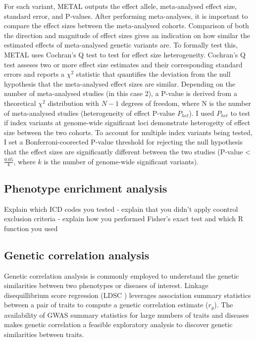 For each variant, METAL outputs the effect allele, meta-analysed effect size, standard error, and P-values. After performing meta-analyses, it is important to compare the effect sizes between the meta-analysed cohorts. Comparison of both the direction and magnitude of effect sizes gives an indication on how similar the estimated effects of meta-analysed genetic variants are. To formally test this, METAL uses Cochran's Q test to test for effect size heterogeneity. Cochran's Q test asseses two or more effect size estimates and their corresponding standard errors and reports a $\chi^{2}$ statistic that quantifies the deviation from the null hypothesis that the meta-analysed effect sizes are similar. Depending on the number of meta-analysed studies (in this case 2), a P-value is derived from a theoretical $\chi^{2}$ distribution with $N-1$ degrees of freedom, where N is the number of meta-analysed studies (heterogeneity of effect P-value $P_{het}$). I used $P_{het}$ to test if index variants at genome-wide significant loci demonstrate heterogeity of effect size between the two cohorts. To account for multiple index variants being tested, I set a Bonferroni-coorected P-value threshold for rejecting the null hypothesis that the effect sizes are significantly different between the two studies (P-value < $\frac{0.05}{k}$, where $k$ is the number of genome-wide significant variants).


\subsection{Phenotype enrichment analysis}
Explain which ICD codes you tested - explain that you didn't apply coontrol exclusion criteria - explain how you performed Fisher's exact test and which R function you used
\subsection{Genetic correlation analysis}
Genetic correlation analysis is commonly employed to understand the genetic similarities between two phenotypes or diseases of interest. Linkage disequillibrium score regression (LDSC \cite{Bulik-Sullivan2015-fk}) leverages association summary statistics between a pair of traits to compute a genetic correlation estimate ($r_{g}$). The availability of GWAS summary statistics for large numbers of traits and diseases makes genetic correlation a feasible exploratory analysis to discover genetic similarities between traits.\\

